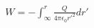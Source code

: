 \documentclass[preview]{standalone}
\begin{document}
\begin{align*}
W = - \int_{\infty}^{r} \frac{Q}{4\pi \epsilon_0 r'^2} dr'
\end{align*}
\end{document}
